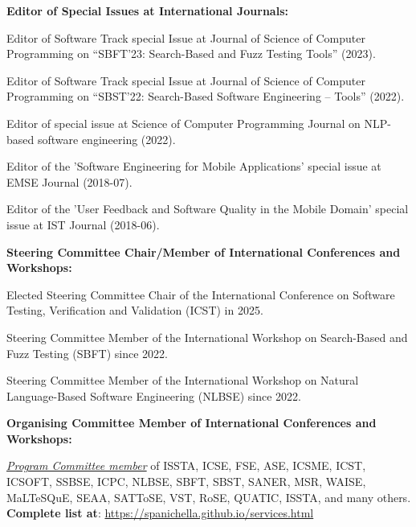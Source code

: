 \documentclass[11pt]{article}
\begin{document}
\medskip 

\textbf{Editor of Special Issues at International Journals:}
\begin{innerlist}
   \item Editor of Software Track special Issue at Journal of Science of Computer Programming on ``SBFT'23: Search-Based and Fuzz Testing Tools'' (2023).
   \item Editor of Software Track special Issue at Journal of Science of Computer Programming on ``SBST’22: Search-Based Software Engineering – Tools'' (2022).
   \item Editor of special issue at Science of Computer Programming Journal on NLP-based software engineering (2022).
   \item Editor of the 'Software Engineering for Mobile Applications' special issue at EMSE Journal (2018-07).
   \item Editor of the 'User Feedback and Software Quality in the Mobile Domain' special issue at IST Journal (2018-06).
\end{innerlist}

\medskip 

\textbf{Steering Committee Chair/Member of International Conferences and Workshops:}
\begin{innerlist}
   \item Elected Steering Committee Chair of the International Conference on Software Testing, Verification and Validation (ICST) in 2025.
   \item Steering Committee Member of the International Workshop on Search-Based and Fuzz Testing (SBFT) since 2022.
   \item Steering Committee Member of the International Workshop on Natural Language-Based Software Engineering (NLBSE) since 2022.
\end{innerlist}

\medskip 

\textbf{Organising Committee Member of International Conferences and Workshops:}
\begin{innerlist}
 \item \href{https://spanichella.github.io/services.html}{\textit{Program Committee member}} of ISSTA, ICSE, FSE, ASE, ICSME, ICST, ICSOFT, SSBSE, ICPC, NLBSE, SBFT, SBST, SANER, MSR, WAISE, MaLTeSQuE, SEAA, SATToSE, VST, RoSE, QUATIC, ISSTA, and many others. 
 \\\textbf{Complete list at}: \href{https://spanichella.github.io/services.html}{https://spanichella.github.io/services.html}
\end{innerlist}
\end{document}
